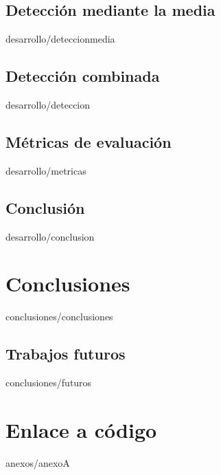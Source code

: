 \documentclass[epsbased,copyright,final,printable,covers,extendedindex,firstnumbered,tfg,gnuplot]{tfgtfmthesisuam}
\begin{document}
  \section{Detección mediante la media\label{SEC:DETECCIONMEDIA}}{desarrollo/deteccionmedia}
  \section{Detección combinada\label{SEC:DETECCION}}{desarrollo/deteccion}
  \section{Métricas de evaluación\label{SEC:METRICAS}}{desarrollo/metricas}
  \section{Conclusión\label{SEC:DPCONCLUSION}}{desarrollo/conclusion}
\chapter{Conclusiones\label{CAP:CONCLUSIONES}}{conclusiones/conclusiones}
  \section{Trabajos futuros\label{SEC:FUTUROS}}{conclusiones/futuros}

\appendix

\chapter{Enlace a código\label{CAP:ANEXOA}}{anexos/anexoA}
\end{document}
